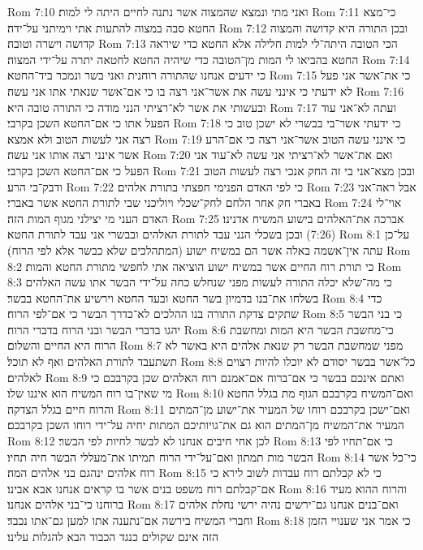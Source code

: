 Rom 7:10  ואני מתי ונמצא שהמצוה אשר נתנה לחיים היתה לי למות׃
Rom 7:11  כי־מצא החטא סבה במצוה להתעות אתי וימיתני על־ידה׃
Rom 7:12  ובכן התורה היא קדושה והמצוה קדושה וישרה וטובה׃
Rom 7:13  הכי הטובה היתה־לי למות חלילה אלא החטא כדי שיראה החטא בהביאו לי המות מן־הטובה כדי שיהיה החטא לחטאה יתרה על־ידי המצוה׃
Rom 7:14  כי ידעים אנחנו שהתורה רוחנית ואני בשר ונמכר ביד־החטא׃
Rom 7:15  כי את־אשר אני פעל לא ידעתי כי אינני עשה את אשר־אני רצה בו כי אם־אשר שנאתי אתו אני עשה׃
Rom 7:16  ובעשותי את אשר לא־רציתי הנני מודה כי התורה טובה היא׃
Rom 7:17  ועתה לא־אני עוד הפעל אתו כי אם־החטא השכן בקרבי׃
Rom 7:18  כי ידעתי אשר־בי בבשרי לא ישכן טוב כי רצה אני לעשות הטוב ולא אמצא׃
Rom 7:19  כי אינני עשה הטוב אשר־אני רצה כי אם־הרע אשר אינני רצה אותו אני עשה׃
Rom 7:20  ואם את־אשר לא־רציתי אני עשה לא־עוד אני הפעל כי אם־החטא השכן בקרבי׃
Rom 7:21  ובכן מצא־אני בי זה החק אנכי רצה לעשות הטוב ודבק־בי הרע׃
Rom 7:22  כי לפי האדם הפנימי חפצתי בתורת אלהים׃
Rom 7:23  אבל ראה־אני באברי חק אחר הלחם לחק־שכלי ויוליכני שבי לתורת החטא אשר באברי׃
Rom 7:24  אוי־לי האדם העני מי יצילני מגוף המות הזה׃
Rom 7:25  אברכה את־האלהים בישוע המשיח אדנינו׃ (7:26) ובכן בשכלי הנני עבד לתורת האלהים ובבשרי אני עבד לתורת החטא׃
Rom 8:1  על־כן עתה אין־אשמה באלה אשר הם במשיח ישוע (המתהלכים שלא כבשר אלא לפי הרוח)׃
Rom 8:2  כי תורת רוח החיים אשר במשיח ישוע הוציאה אתי לחפשי מתורת החטא והמות׃
Rom 8:3  כי מה־שלא יכלה התורה לעשות מפני שנחלש כחה על־ידי הבשר אתו עשה האלהים בשלחו את־בנו בדמיון בשר החטא ובעד החטא וירשיע את־החטא בבשר׃
Rom 8:4  כדי שתקים צדקת התורה בנו ההלכים לא־כדרך הבשר כי אם־לפי הרוח׃
Rom 8:5  כי בני הבשר יהגו בדברי הבשר ובני הרוח בדברי הרוח׃
Rom 8:6  כי־מחשבת הבשר היא המות ומחשבת הרוח היא החיים והשלום׃
Rom 8:7  מפני שמחשבת הבשר רק שנאת אלהים היא באשר לא תשתעבד לתורת האלהים ואף לא תוכל׃
Rom 8:8  כל־אשר בבשר יסודם לא יוכלו להיות רצוים לאלהים׃
Rom 8:9  ואתם אינכם בבשר כי אם־ברוח אם־אמנם רוח האלהים שכן בקרבכם כי מי שאין־בו רוח המשיח הוא איננו שלו׃
Rom 8:10  ואם־המשיח בקרבכם הגוף מת בגלל החטא והרוח חיים בגלל הצדקה׃
Rom 8:11  ואם־ישכן בקרבכם רוחו של המעיר את־ישוע מן־המתים המעיר את־המשיח מן־המתים הוא גם את־גויותיכם המתות יחיה על־ידי רוחו השכן בקרבכם׃
Rom 8:12  לכן אחי חיבים אנחנו לא לבשר לחיות לפי הבשר׃
Rom 8:13  כי אם־תחיו לפי הבשר מות תמתון ואם־על־ידי הרוח תמיתו את־מעללי הבשר חיה תחיו׃
Rom 8:14  כי־כל אשר רוח אלהים ינהגם בני אלהים המה׃
Rom 8:15  כי לא קבלתם רוח עבדות לשוב לירא כי אם־קבלתם רוח משפט בנים אשר בו קראים אנחנו אבא אבינו׃
Rom 8:16  והרוח ההוא מעיד ברוחנו כי־בני אלהים אנחנו׃
Rom 8:17  ואם־בנים אנחנו גם־ירשים נהיה ירשי נחלת אלהים וחברי המשיח בירשה אם־נתענה אתו למען גם־אתו נכבד׃
Rom 8:18  כי אמר אני שענויי הזמן הזה אינם שקולים כנגד הכבוד הבא להגלות עלינו׃
